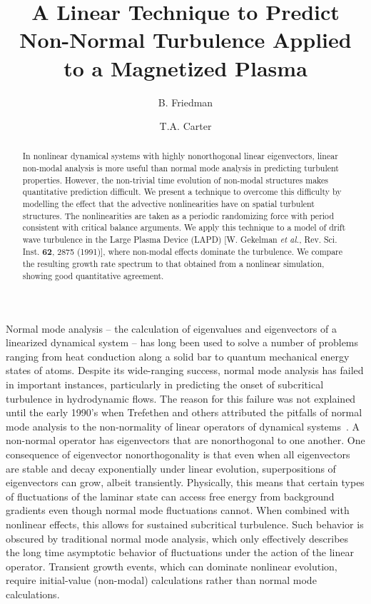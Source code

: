 \documentclass[letter,scriptaddress,twocolumn, prl,showkeys]{revtex4}
\begin{document}
\title{A Linear Technique to Predict Non-Normal Turbulence Applied to a Magnetized Plasma}

\author{B. Friedman}

\author{T.A. Carter}




\begin{abstract}
In nonlinear dynamical systems with highly nonorthogonal linear eigenvectors, linear non-modal analysis is more useful than normal mode analysis in predicting turbulent properties. 
However, the non-trivial time evolution of non-modal structures makes quantitative prediction difficult. We present a technique to overcome this difficulty by modelling the effect that the advective nonlinearities have on spatial turbulent structures. The nonlinearities are taken as a periodic randomizing force with
period consistent with critical balance arguments. We apply this technique to a model of drift wave turbulence in the Large Plasma Device (LAPD) 
[W. Gekelman \emph{et al.}, Rev. Sci. Inst. {\bf 62}, 2875 (1991)], where non-modal effects dominate the turbulence.
We compare the resulting growth rate spectrum to that obtained from a nonlinear simulation, showing good quantitative agreement.
\end{abstract}

\maketitle

Normal mode analysis -- the calculation of eigenvalues and eigenvectors of a linearized dynamical system -- has long been used to solve a number of problems ranging from
heat conduction along a solid bar to quantum mechanical energy states of atoms. Despite its wide-ranging success, normal mode analysis has
failed in important instances, particularly in predicting the onset of subcritical turbulence in hydrodynamic flows. 
The reason for this failure was not explained until the early 1990's when Trefethen and others attributed the pitfalls of normal mode analysis to the non-normality of linear operators of
dynamical systems~\cite{trefethen1993,trefethen2005, schmid2007}. A non-normal operator has 
eigenvectors that are nonorthogonal to one another. One consequence of eigenvector nonorthogonality is that even when all eigenvectors are stable and decay exponentially under linear evolution, 
superpositions of eigenvectors can grow, albeit transiently.
Physically, this means that certain types of fluctuations of the laminar state can access free energy from background gradients even though normal mode fluctuations cannot.
When combined with nonlinear effects, this allows for sustained subcritical turbulence.
Such behavior is obscured by traditional normal mode analysis, which only effectively describes the long time asymptotic behavior of fluctuations under the 
action of the linear operator. Transient growth events, which can dominate nonlinear evolution, require initial-value (non-modal) calculations rather than normal mode calculations.
\end{document}

